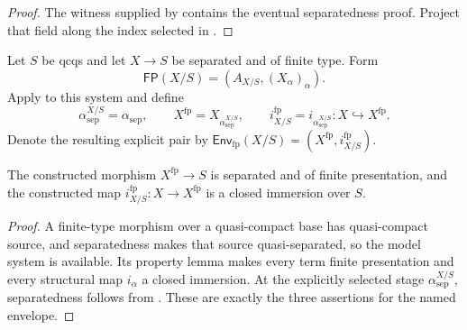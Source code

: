 \begin{proof}
  \leanok
  The witness supplied by
   contains the eventual
  separatedness proof.  Project that field along the index selected in
  .
\end{proof}

\begin{definition}
  \label{def:nagata-finite-type-closed-in-fp}

  Let $S$ be qcqs and let $X\to S$ be separated and of finite type.  Form
  \[
    \mathsf{FP}(X/S)=(A_{X/S},(X_\alpha)_\alpha).
  \]
  Apply  to this system and
  define
  \[
    \alpha^{X/S}_{\mathrm{sep}}
      =\alpha_{\mathrm{sep}},
    \qquad
    X^{\mathrm{fp}}=X_{\alpha^{X/S}_{\mathrm{sep}}},
    \qquad
    i^{\mathrm{fp}}_{X/S}
      =i_{\alpha^{X/S}_{\mathrm{sep}}}\colon X\hookrightarrow X^{\mathrm{fp}}.
  \]
  Denote the resulting explicit pair by
  $\mathsf{Env}_{\mathrm{fp}}(X/S)=(X^{\mathrm{fp}},i^{\mathrm{fp}}_{X/S})$.
\end{definition}

\begin{proposition}
  \label{prop:nagata-finite-type-closed-in-fp}
  \leanok

  The constructed morphism $X^{\mathrm{fp}}\to S$ is separated and of
  finite presentation, and the constructed map
  $i^{\mathrm{fp}}_{X/S}\colon X\to X^{\mathrm{fp}}$ is a closed immersion
  over $S$.
\end{proposition}

\begin{proof}
  \leanok
  A finite-type morphism over a quasi-compact base has quasi-compact source,
  and separatedness makes that source quasi-separated, so the model system is
  available.  Its property lemma makes every term finite presentation and
  every structural map $i_\alpha$ a closed immersion.  At the explicitly
  selected stage $\alpha^{X/S}_{\mathrm{sep}}$, separatedness follows from
  .  These are exactly the
  three assertions for the named envelope.
\end{proof}


